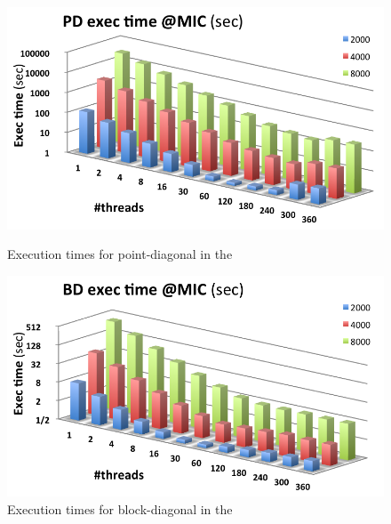 \documentclass[../thesis]{subfiles}
\begin{document}
	\begin{figure}[t]
		\begin{minipage}{0.48\textwidth}
			\centering
			\includegraphics[width=\textwidth]{assets/images/mic/point-diagonal.png}
			\captionsetup{font=small}
			\caption{Execution times for point-diagonal in the \intel\xeonphi}
			\label{fig:mic:point:diagonal:times}
		\end{minipage}
		\hfill
		\begin{minipage}{0.48\textwidth}
			\centering
			\includegraphics[width=\textwidth]{assets/images/mic/block-diagonal.png}
			\captionsetup{font=small}
			\caption{Execution times for block-diagonal in the \intel\xeonphi}
			\label{fig:mic:block:diagonal:times}
		\end{minipage}
	\end{figure}
\end{document}
